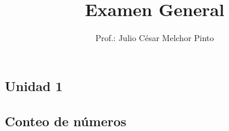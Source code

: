 \documentclass[12pt,addpoints]{evalua}
\title{Examen General}
\author{Prof.: Julio César Melchor Pinto}
\begin{document}
\vfill
\tableofcontents
\afterpage{\blankpage}
\begin{questions}\large
	\section*{Unidad 1}

	\subsection*{Conteo de números}



\end{questions}
\end{document}
